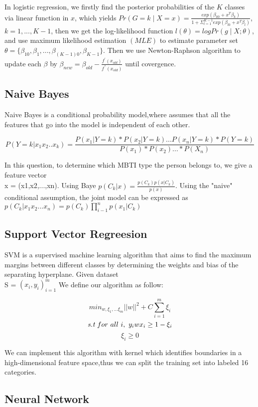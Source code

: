\documentclass{article}
\begin{document}
In logistic regression, we firstly find the posterior probabilities of the $K$ classes via linear function in $x$, which yields $Pr\left(G = k\mid X = x\right) = \frac{exp\left(\beta_{k0}+x^{T} \beta_{k}\right)}{1+\Sigma_{l=1}^{K-1}exp\left(\beta_{l0}+x^{T} \beta_{l}\right)}$, $k = 1,...,K-1$, then we get the log-likelihood function $l(\theta) = logPr\left(g\mid X; \theta\right) $, and use maximum likelihood estimation $\left(MLE\right)$ to estimate parameter set $\theta = \{\beta_{10},\beta_1,...,\beta_{\left(K-1\right)0},\beta_{K-1} \}$. Then we use Newton-Raphson algorithm to update each $\beta$ by $\beta_{new} = \beta_{old} - \frac{f^{'}\left(x_{old}\right)}{f^{''}\left(x_{old}\right)}$ until covergence.

\subsection{Naive Bayes}
Naive Bayes is a conditional probability model,where  assumes that all the features that go into the model is independent of each other.

$$ P(Y= k|x_1x_2..x_k)= \frac{P(x_1|Y=k)*P(x_2|Y=k)...P(x_n|Y=k)*P(Y = k) }{ P(x_1)*P(x_2)...* P(X_n)}$$

In this question, to determine which MBTI type the person belongs to, we give a feature vector\\ x = (x1,x2,...,xn). Using Baye $ p(C_k|x) = \frac{p(C_k)p(x|C_k)}{p(x)} $. Using the "naive" conditional assumption, the joint model can be expressed as $p(C_k|x_1x_2...x_n) = p(C_k)\prod_{i-1}^n p(x_1|C_k)$ 

\subsection{Support Vector Regreesion}

SVM is a supervised machine learning algorithm that aims to find the maximum margins between different classes by determining the weights and bias of the separating hyperplane. Given dataset \\S = ${(x_i,y_i)}_{i=1}^m $ We define our algorithm as follow:

$$ min_{w,\xi_1,...\xi_m}||w||^2 + C\sum_{i=1}^m \xi_i $$
$$ \emph{s.t} \ for \ all \ i, \ y_i w x_i \ge 1 - \xi_i $$
$$ \xi_i \ge 0 $$  


We can implement this algorithm with kernel which identifies boundaries in a high-dimensional feature space,thus  we can split the training set into labeled 16 categories.
\subsection{Neural Network}
\end{document}

